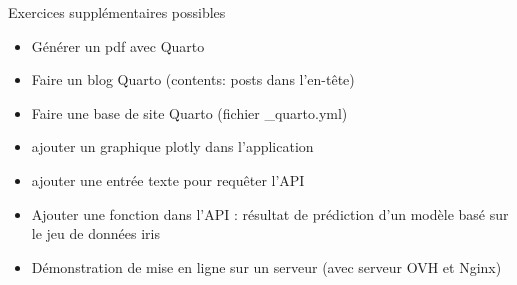 \documentclass[pdftex,xcolor={table}]{beamer} %
\begin{document}
  \begin{frame}{Exercices supplémentaires possibles}
    \begin{itemize}
      \item Générer un pdf avec Quarto 
      \item Faire un blog Quarto (contents: posts dans l'en-tête)
      \item Faire une base de site Quarto (fichier \_quarto.yml)
      \item ajouter un graphique plotly dans l'application
      \item ajouter une entrée texte pour requêter l'API
      \item Ajouter une fonction dans l'API : résultat de prédiction d'un modèle basé sur le jeu de données iris
      \item Démonstration de mise en ligne sur un serveur (avec serveur OVH et Nginx)
    \end{itemize}
  \end{frame}

\end{document}
